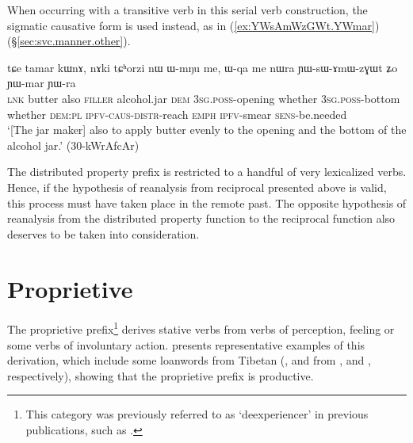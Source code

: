 When occurring with a transitive verb in this serial verb construction, the sigmatic causative form  is used instead, as in (\ref{ex:YWsAmWzGWt.YWmar}) (§\ref{sec:svc.manner.other}).

\begin{exe}
\ex \label{ex:YWsAmWzGWt.YWmar}
\gll tɕe tamar kɯnɤ, nɤki tɕʰorzi nɯ ɯ-mŋu me,  ɯ-qa me nɯra ɲɯ-sɯ-ɤmɯ-zɣɯt ʑo ɲɯ-mar ɲɯ-ra  \\
\textsc{lnk} butter also \textsc{filler} alcohol.jar \textsc{dem} \textsc{3sg}.\textsc{poss}-opening whether \textsc{3sg}.\textsc{poss}-bottom whether \textsc{dem}:\textsc{pl} \textsc{ipfv}-\textsc{caus}-\textsc{distr}-reach \textsc{emph} \textsc{ipfv}-smear \textsc{sens}-be.needed \\
\glt `[The jar maker] also to apply butter evenly to the opening and the  bottom of the alcohol jar.' (30-kWrAfcAr) 
\end{exe} 

The distributed property  prefix is restricted to a handful of very lexicalized verbs. Hence, if the hypothesis of reanalysis from reciprocal presented above is valid, this process must have taken place in the remote past. The opposite hypothesis of reanalysis from the distributed property function to the reciprocal function also deserves to be taken into consideration.

\section{Proprietive} \label{sec:proprietive}
The proprietive  prefix\footnote{This category was previously referred to as `deexperiencer' in previous publications, such as \citet{jacques12demotion}. } derives stative verbs from verbs of perception, feeling or some verbs of involuntary action.  presents representative examples of this derivation, which include some loanwords from Tibetan (,  and 
 from ,  and , respectively), showing that the proprietive prefix is productive.
 
